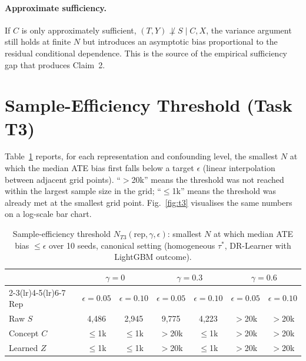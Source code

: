 \documentclass{article}
\begin{document}
\paragraph{Approximate sufficiency.}
If $C$ is only approximately sufficient, $(T,Y)\not\perp S\mid C,X$, the
variance argument still holds at finite $N$ but introduces an asymptotic bias
proportional to the residual conditional dependence. This is the source of the
empirical sufficiency gap that produces Claim~2.

\section{Sample-Efficiency Threshold (Task T3)}
\label{app:t3}
Table~\ref{tab:t3} reports, for each representation and confounding level, the
smallest $N$ at which the median ATE bias first falls below a target
$\epsilon$ (linear interpolation between adjacent grid points).
``$>$20k'' means the threshold was not reached within the largest sample size
in the grid; ``$\leq$1k'' means the threshold was already met at the smallest
grid point. Fig.~\ref{fig:t3} visualises the same numbers on a log-scale bar
chart.

\begin{table}[h]
\caption{Sample-efficiency threshold $N_{T3}(\text{rep},\gamma,\epsilon)$:
smallest $N$ at which median ATE bias $\leq\epsilon$ over 10 seeds, canonical
setting (homogeneous $\tau^*$, DR-Learner with LightGBM outcome).}
\label{tab:t3}
\centering
\small
\begin{tabular}{lcccccc}
\toprule
 & \multicolumn{2}{c}{$\gamma=0$} & \multicolumn{2}{c}{$\gamma=0.3$} & \multicolumn{2}{c}{$\gamma=0.6$} \\
\cmidrule(lr){2-3}\cmidrule(lr){4-5}\cmidrule(lr){6-7}
Rep & $\epsilon{=}0.05$ & $\epsilon{=}0.10$ & $\epsilon{=}0.05$ & $\epsilon{=}0.10$ & $\epsilon{=}0.05$ & $\epsilon{=}0.10$ \\
\midrule
Raw $S$       & 4{,}486    & 2{,}945    & 9{,}775    & 4{,}223    & $>$20k & $>$20k \\
Concept $C$   & $\leq$1k   & $\leq$1k   & $>$20k     & $\leq$1k   & $>$20k & $>$20k \\
Learned $Z$   & $\leq$1k   & $\leq$1k   & $>$20k     & $\leq$1k   & $>$20k & $>$20k \\
\bottomrule
\end{tabular}
\end{table}
\end{document}
